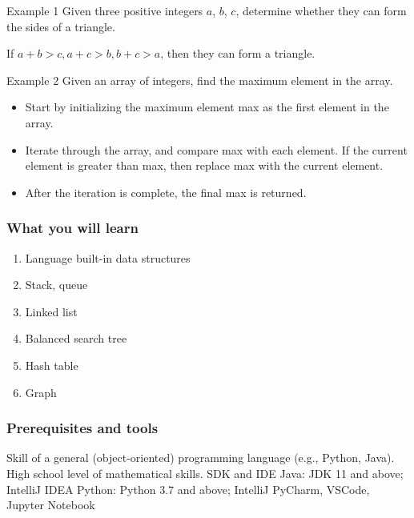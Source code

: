 \documentclass[aspectratio=169, 14pt]{beamer}
\begin{document}
\begin{frame}

	\begin{exampleblock}{Example 1}
		Given three positive integers $a$, $b$, $c$, determine whether they can form the sides of a triangle.
	\end{exampleblock}
	If $a + b > c, a + c > b, b + c > a$, then they can form a triangle.
\end{frame}

\begin{frame}
	\begin{exampleblock}{Example 2}
		Given an array of integers, find the maximum element in the array.
	\end{exampleblock}
	\begin{itemize}
		\item Start by initializing the maximum element \alert{max} as the first element in the array.
		\item Iterate through the array, and compare \alert{max} with each element. If the current element is greater than \alert{max}, then replace \alert{max} with the current element.
		\item After the iteration is complete, the final \alert{max} is returned.
	\end{itemize}
\end{frame}

\begin{frame}
	\frametitle{What you will learn}
	\begin{enumerate}
		\item Language built-in data structures
		\item Stack, queue
		\item Linked list
		\item Balanced search tree
		\item Hash table
		\item Graph
	\end{enumerate}
\end{frame}

\begin{frame}
	\frametitle{Prerequisites and tools}
	\begin{outline}
		\1 Skill of a general (\alert{object-oriented}) programming language (e.g., Python, Java).
		\1 High school level of mathematical skills.
		\1 SDK and IDE
		\2 Java: JDK 11 and above; IntelliJ IDEA
		\2 Python: Python 3.7 and above; IntelliJ PyCharm, VSCode, Jupyter Notebook
	\end{outline}
\end{frame}
\end{document}
